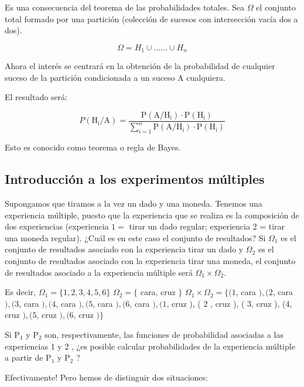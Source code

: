 \documentclass[
]{article}
\begin{document}
Es una consecuencia del teorema de las probabilidades totales. Sea
\(\Omega\) el conjunto total formado por una partición (colección de
sucesos con intersección vacía dos a dos).

\[
\Omega=H_{1} \cup \ldots \ldots \cup H_{n}
\]

Ahora el interés se centrará en la obtención de la probabilidad de
cualquier suceso de la partición condicionada a un suceso A cualquiera.

El resultado será:

\[
P\left(\mathrm{H}_{\mathrm{i}} / \mathrm{A}\right)=\frac{\mathrm{P}\left(\mathrm{A} / \mathrm{H}_{\mathrm{i}}\right) \cdot \mathrm{P}\left(\mathrm{H}_{\mathrm{i}}\right)}{\sum_{i=1}^{n} \mathrm{P}\left(\mathrm{A} / \mathrm{H}_{\mathrm{i}}\right) \cdot \mathrm{P}\left(\mathrm{H}_{\mathrm{i}}\right)}
\]

Esto es conocido como teorema o regla de Bayes.

\subsection{Introducción a los experimentos múltiples}\label{introducciuxf3n-a-los-experimentos-muxfaltiples}

Supongamos que tiramos a la vez un dado y una moneda. Tenemos una
experiencia múltiple, puesto que la experiencia que se realiza es la
composición de dos experiencias (experiencia \(1=\) tirar un dado regular;
experiencia 2 = tirar una moneda regular). ¿Cuál es en este caso el
conjunto de resultados? Si \(\Omega_{1}\) es el conjunto de resultados
asociado con la experiencia tirar un dado y \(\Omega_{2}\) es el conjunto
de resultados asociado con la experiencia tirar una moneda, el conjunto
de resultados asociado a la experiencia múltiple será
\(\Omega_{1} \times \Omega_{2}\).

Es decir, \(\Omega_{1}=\{1,2,3,4,5,6\}\) \(\Omega_{2}=\{\) cara, cruz \(\}\)
\(\Omega_{1} \times \Omega_{2}=\{(1\), cara \(),(2\), cara \(),(3\), cara
\(),(4\), cara \(),(5\), cara \(),(6\), cara \(),(1\), cruz ), ( 2 , cruz ), (
3, cruz ), (4, cruz \(),(5\), cruz \(),(6\), cruz \()\}\)

Si \(\mathrm{P}_{1}\) y \(\mathrm{P}_{2}\) son, respectivamente, las
funciones de probabilidad asociadas a las experiencias 1 y 2 , ¿es
posible calcular probabilidades de la experiencia múltiple a partir de
\(\mathrm{P}_{1}\) y \(\mathrm{P}_{2}\) ?

Efectivamente! Pero hemos de distinguir dos situaciones:
\end{document}
